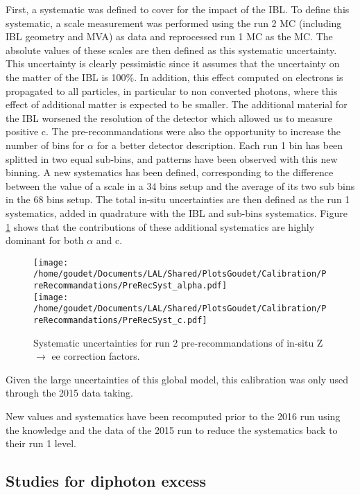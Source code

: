 First, a systematic was defined to cover for the impact of the IBL.
To define this systematic, a scale measurement was performed using the run 2 MC (including IBL geometry and MVA) as data and reprocessed run 1 MC as the MC.
The absolute values of these scales are then defined as this systematic uncertainty.
This uncertainty is clearly pessimistic since it assumes that the uncertainty on the matter of the IBL is 100\%.
In addition, this effect computed on electrons is propagated to all particles, in particular to non converted photons, where this effect of additional matter is expected to be smaller.
The additional material for the IBL worsened the resolution of the detector which allowed us to measure positive c.
The pre-recommandations were also the opportunity to increase the number of bins for $\alpha$ for a better detector description.
Each run 1 bin has been splitted in two equal sub-bins, and patterns have been observed with this new binning.
A new systematics has been defined, corresponding to the difference between the value of a scale in a 34 bins setup and the average of its two sub bins in the 68 bins setup.
The total in-situ uncertainties are then defined as the run 1 systematics, added in quadrature with the IBL and sub-bins systematics.
Figure \ref{org95bdf2b} shows that the contributions of these additional systematics are highly dominant for both $\alpha$ and c.

\begin{figure}
  \centering
\texttt{[image: /home/goudet/Documents/LAL/Shared/PlotsGoudet/Calibration/PreRecommandations/PreRecSyst\_alpha.pdf]}\\
\texttt{[image: /home/goudet/Documents/LAL/Shared/PlotsGoudet/Calibration/PreRecommandations/PreRecSyst\_c.pdf]}
\caption{\label{org95bdf2b}
Systematic uncertainties for run 2 pre-recommandations of in-situ Z\(\rightarrow\) ee correction factors.}
\end{figure}

Given the large uncertainties of this global model, this calibration was only used through the 2015 data taking.

New values and systematics have been recomputed prior to the 2016 run using the knowledge and the data of the 2015 run to reduce the systematics back to their run 1 level.

\subsection{Studies for diphoton excess}
\label{sec:orgeabf89e}
\label{sec:calibration_scaleForExcess}

